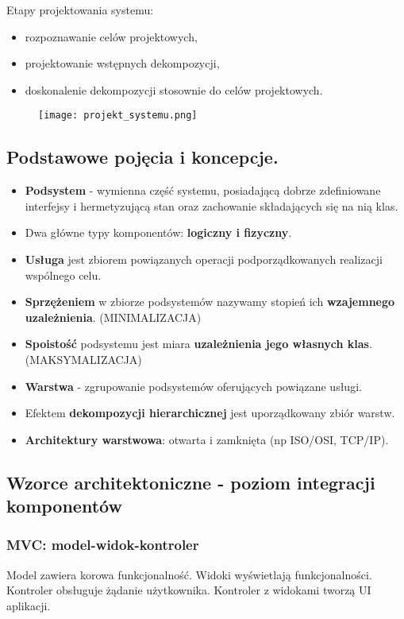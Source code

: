 \documentclass[a4paper]{article}
\begin{document}
    Etapy projektowania systemu:
    \begin{itemize}
        \item rozpoznawanie celów projektowych,
        \item projektowanie wstępnych dekompozycji,
        \item doskonalenie dekompozycji stosownie do celów projektowych.
    \end{itemize}

    \begin{figure}[H]
        \texttt{[image: projekt\_systemu.png]}
    \end{figure}

    \subsection{Podstawowe pojęcia i koncepcje.}
    \begin{itemize}
        \item \textbf{Podsystem} - wymienna część systemu, posiadającą dobrze zdefiniowane interfejsy i
        hermetyzującą stan oraz zachowanie składających się na nią klas.
        \item Dwa główne typy komponentów: \textbf{logiczny i fizyczny}.
        \item \textbf{Usługa} jest zbiorem powiązanych operacji podporządkowanych realizacji wspólnego
        celu.
        \item \textbf{Sprzężeniem} w zbiorze podsystemów nazywamy stopień ich \textbf{wzajemnego uzależnienia}. (MINIMALIZACJA)
        \item \textbf{Spoistość} podsystemu jest miara \textbf{uzależnienia jego własnych klas}. (MAKSYMALIZACJA)
        \item \textbf{Warstwa} - zgrupowanie podsystemów oferujących powiązane usługi.
        \item Efektem \textbf{dekompozycji hierarchicznej} jest uporządkowany zbiór warstw.
        \item \textbf{Architektury warstwowa}: otwarta i zamknięta (np ISO/OSI, TCP/IP).
    \end{itemize}


    \subsection{Wzorce architektoniczne - poziom integracji komponentów}

    \subsubsection{MVC: model-widok-kontroler}
    Model zawiera korowa funkcjonalność. Widoki wyświetlają funkcjonalności. Kontroler obsługuje żądanie użytkownika. Kontroler z widokami tworzą UI aplikacji.
\end{document}
